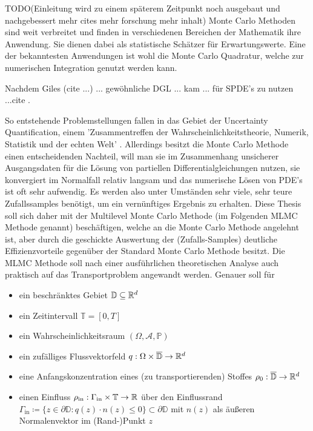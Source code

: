 
TODO(Einleitung wird zu einem späterem Zeitpunkt noch ausgebaut und nachgebessert mehr cites mehr forschung mehr inhalt)
Monte Carlo Methoden sind weit verbreitet und finden in verschiedenen Bereichen der Mathematik ihre Anwendung.
Sie dienen dabei als statistische Schätzer für Erwartungswerte. 
Eine der bekanntesten Anwendungen ist wohl die Monte Carlo Quadratur, welche zur numerischen Integration genutzt werden kann.
 
Nachdem Giles (cite ...) ... gewöhnliche DGL ... kam ... für SPDE's zu nutzen ...cite .

So entstehende Problemstellungen fallen in das Gebiet der Uncertainty Quantification, einem 'Zusammentreffen der Wahrscheinlichkeitstheorie, Numerik, Statistik und der echten Welt' \cite{sullivan2015introduction}.
Allerdings besitzt die Monte Carlo Methode einen entscheidenden Nachteil, will man sie im Zusammenhang unsicherer Ausgangsdaten für die Lösung von partiellen Differentialgleichungen nutzen, sie konvergiert im Normalfall relativ langsam und das numerische Lösen von PDE's ist oft sehr aufwendig.
Es werden also unter Umständen sehr viele, sehr teure Zufallssamples benötigt, um ein vernünftiges Ergebnis zu erhalten. \newline
Diese Thesis soll sich daher mit der Multilevel Monte Carlo Methode (im Folgenden MLMC Methode genannt) beschäftigen, welche an die Monte Carlo Methode angelehnt ist, aber durch die geschickte Auswertung der (Zufalls-Samples) deutliche Effizienzvorteile gegenüber der Standard Monte Carlo Methode besitzt.
Die MLMC Methode soll nach einer ausführlichen theoretischen Analyse auch praktisch auf das Transportproblem angewandt werden.
Genauer soll für
\begin{itemize}
	\item ein beschränktes Gebiet $\mathbb{D} \subseteq \mathbb{R}^d$
	\item  ein Zeitintervall $\mathbb{T} = [0,T]$
	\item  ein Wahrscheinlichkeitsraum $(\Omega,\mathcal{A},\mathbb{P})$
	\item  ein zufälliges Flussvektorfeld $q: \Omega \times \overline{\mathbb{D}} \rightarrow \mathbb{R}^d$
	\item  eine Anfangskonzentration eines (zu transportierenden) Stoffes $\rho_0: \overline{\mathbb{D}} \rightarrow \mathbb{R}^d$
	\item einen Einfluss $\rho_{\text{in}} : \Gamma_{\text{in}} \times \mathbb{T} \rightarrow \mathbb{R}$ über den Einflussrand $\Gamma_{\text{in}} \coloneqq  \{ z \in \partial \mathbb{D}: q(z)\cdot n(z) \leq 0 \} \subset  \partial \mathbb{D}$ mit $n(z)$ als äußeren Normalenvektor im (Rand-)Punkt $z$
\end{itemize}
